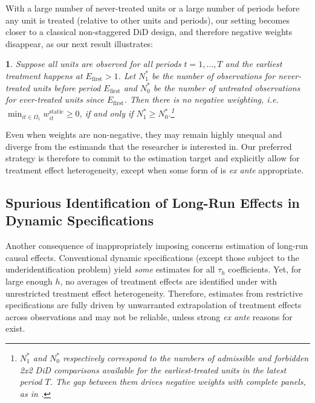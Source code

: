 \documentclass[english,11pt]{article}
\theoremstyle{plain}
\theoremstyle{plain}
\newtheorem{prop}{\protect\propositionname}
\theoremstyle{plain}
\theoremstyle{plain}
\let\ref\Cref
\providecommand{\propositionname}{Proposition}
\begin{document}
With a large number of never-treated units or a large number of periods
before any unit is treated (relative to other units and periods),
our setting becomes closer to a classical non-staggered DiD design,
and therefore negative weights disappear, as our next result illustrates:
\begin{prop}
\label{prop:anynegweights}Suppose all units are observed for all
periods $t=1,\dots,T$ and the earliest treatment happens at $E_{\text{first}}>1$.
Let $N_{1}^{*}$ be the number of observations for never-treated units
before period $E_{\text{first}}$ and $N_{0}^{*}$ be the number of
untreated observations for ever-treated units since $E_{\text{first}}$.
Then there is no negative weighting, i.e. $\min_{it\in\Omega_{1}}w_{it}^{\text{static}}\ge0$,
if and only if $N_{1}^{*}\ge N_{0}^{*}$.\footnote{$N_{1}^{\ast}$ and $N_{0}^{\ast}$ respectively correspond to the
numbers of admissible and forbidden 2x2 DiD comparisons available
for the earliest-treated units in the latest period $T$. The gap
between them drives negative weights with complete panels, as in \textcite[Proposition 1]{Strezhnev2018}.}
\end{prop}
Even when weights are non-negative, they may remain highly unequal
and diverge from the estimands that the researcher is interested in.
Our preferred strategy is therefore to commit to the estimation target
and explicitly allow for treatment effect heterogeneity, except when
some form of \ref{assu:A3} is \emph{ex ante }appropriate.

\subsection{Spurious Identification of Long-Run Effects in Dynamic Specifications\label{subsec:Spurious}}

Another consequence of inappropriately imposing \ref{assu:A3} concerns
estimation of long-run causal effects. Conventional dynamic specifications
(except those subject to the underidentification problem) yield \emph{some
}estimates for all $\tau_{h}$ coefficients. Yet, for large enough
$h$, no averages of treatment effects are identified under \ref{assu:A1,assu:A2}
with unrestricted treatment effect heterogeneity. Therefore, estimates
from restrictive specifications are fully driven by unwarranted extrapolation
of treatment effects across observations and may not be reliable,
unless strong \emph{ex ante }reasons for \ref{assu:A3} exist.
\end{document}
